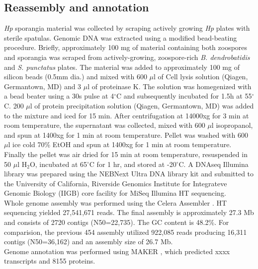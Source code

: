 \subsection*{Reassembly and annotation}
\textit{Hp} sporangia material was collected by scraping actively growing \textit{Hp} plates with sterile spatulas. Genomic DNA was extracted using a modified bead-beating procedure. Briefly, approximately 100 mg of material containing both zoospores and sporangia was scraped from actively-growing, zoospore-rich \textit{B. dendrobatidis} and \textit{S. punctatus} plates. The material was added to approximately 100 mg of silicon beads (0.5mm dia.) and mixed with 600 $\mu$l of Cell lysis solution (Qiagen, Germantown, MD) and 3 $\mu$l of proteinase K. The solution was homegenized with a bead beater using a 30s pulse at 4$^{\circ}$C and subsequently incubated for 1.5h at 55$^{\circ}$C. 200 $\mu$l of protein precipitation solution (Qiagen, Germantown, MD) was added to the mixture and iced for 15 min. After centrifugation at 14000xg for 3 min at room temperature, the supernatant was collected, mixed with 600 $\mu$l isopropanol, and spun at 1400xg for 1 min at room temperature. Pellet was washed with 600 $\mu$l ice cold 70\% EtOH and spun at 1400xg for 1 min at room temperature. Finally the pellet was air dried for 15 min at room temperature, resuspended in 50 $\mu$l H$_{2}$O, incubated at 65$^{\circ}$C for 1 hr, and stored at -20$^{\circ}$C. A DNAseq Illumina library was prepared using the NEBNext Ultra DNA library kit and submitted to the University of California, Riverside Genomics Institute for Integrateve Genomic Biology (IIGB) core facility for MiSeq Illumina HT sequencing.\\
\indent Whole genome assembly was performed using the Celera Assembler \cite{Myers2000}. HT sequencing yielded 27,541,671 reads. The final assembly is approximately 27.3 Mb and consists of 2720 contigs (N50=22,735). The GC content is 48.2\%. For comparision, the previous 454 assembly utilized 922,085 reads producing 16,311 contigs (N50=36,162) and an assembly size of 26.7 Mb.\\
\indent Genome annotation was performed using MAKER \cite{Cantarel2008}, which predicted xxxx transcripts and 8155 proteins.\\
